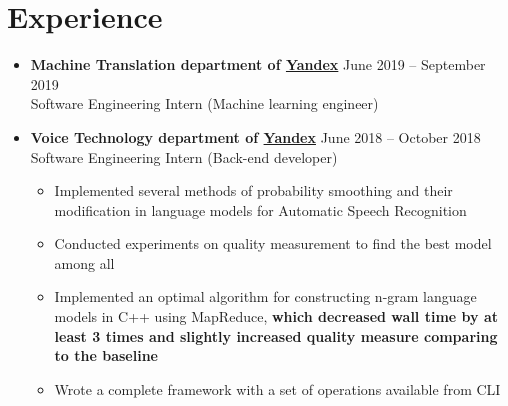 \documentclass[letterpaper,11pt]{article}
\newcommand{\resumeSubHeadingListStart}{\begin{itemize}[leftmargin=*]}
\newcommand{\resumeSubHeadingListEnd}{\end{itemize}}
\begin{document}
\vspace{-10pt}
\section{Experience}
  \resumeSubHeadingListStart
      \item{
        \textbf{Machine Translation department of \href{https://yandex.com/company/}{\color{blue} Yandex}}
        \hfill
        June 2019 -- September 2019 \\
        Software Engineering Intern (Machine learning engineer)
      }
      \vspace{-4pt}
      \item{
        \textbf{Voice Technology department of \href{https://yandex.com/company/}{\color{blue} Yandex}}
        \hfill
        June 2018 -- October 2018 \\
        Software Engineering Intern (Back-end developer)
      }
      \vspace{-6pt}
      \begin{itemize}
        \item Implemented several methods of probability smoothing and their modification in language models for Automatic Speech Recognition
        \vspace{-2pt}
        \item Conducted experiments on quality measurement to find the best model among all
		\vspace{-2pt}        
        \item Implemented an optimal algorithm for constructing n-gram language models in C++ using MapReduce, \textbf{which decreased wall time by at least 3 times and slightly increased quality measure comparing to the baseline}
        \vspace{-2pt}
        \item Wrote a complete framework with a set of operations available from CLI
      \end{itemize}
  \resumeSubHeadingListEnd

\vspace{-19pt}
\end{document}
